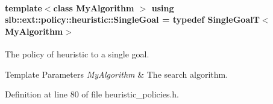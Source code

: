\paragraph[{\texorpdfstring{Single\+Goal}{SingleGoal}}]{\setlength{\rightskip}{0pt plus 5cm}template$<$class My\+Algorithm $>$ using {\bf slb\+::ext\+::policy\+::heuristic\+::\+Single\+Goal} = typedef {\bf Single\+GoalT}$<$My\+Algorithm$>$}\hypertarget{namespaceslb_1_1ext_1_1policy_1_1heuristic_a6cee0282472a5ca36af95af31fc3513d}{}\label{namespaceslb_1_1ext_1_1policy_1_1heuristic_a6cee0282472a5ca36af95af31fc3513d}


The policy of heuristic to a single goal. 


\begin{DoxyTemplParams}{Template Parameters}
{\em My\+Algorithm} & The search algorithm. \\
\hline
\end{DoxyTemplParams}


Definition at line 80 of file heuristic\+\_\+policies.\+h.


